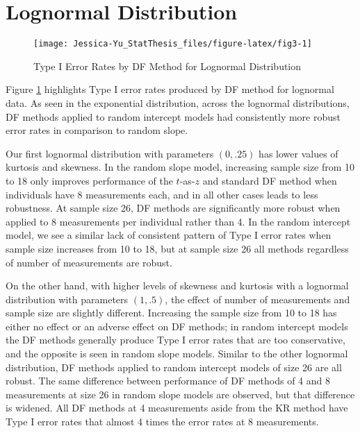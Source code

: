 \documentclass[12pt, twoside]{amherstthesis}
\begin{document}
\hypertarget{lognormal-distribution}{%
\section{Lognormal Distribution}\label{lognormal-distribution}}
\begin{figure}

{\centering \texttt{[image: Jessica-Yu\_StatThesis\_files/figure-latex/fig3-1]} 

}

\caption{Type I Error Rates by DF Method for Lognormal Distribution}\label{fig:fig3}
\end{figure}
Figure \ref{fig:fig3} highlights Type I error rates produced by DF method for lognormal data. As seen in the exponential distribution, across the lognormal distributions, DF methods applied to random intercept models had consistently more robust error rates in comparison to random slope.

Our first lognormal distribution with parameters \((0,.25)\) has lower values of kurtosis and skewness. In the random slope model, increasing sample size from 10 to 18 only improves performance of the \(t\)-as-\(z\) and standard DF method when individuals have 8 measurements each, and in all other cases leads to less robustness. At sample size 26, DF methods are significantly more robust when applied to 8 measurements per individual rather than 4. In the random intercept model, we see a similar lack of consistent pattern of Type I error rates when sample size increases from 10 to 18, but at sample size 26 all methods regardless of number of measurements are robust.

On the other hand, with higher levels of skewness and kurtosis with a lognormal distribution with parameters \((1,.5)\), the effect of number of measurements and sample size are slightly different. Increasing the sample size from 10 to 18 has either no effect or an adverse effect on DF methods; in random intercept models the DF methods generally produce Type I error rates that are too conservative, and the opposite is seen in random slope models. Similar to the other lognormal distribution, DF methods applied to random intercept models of size 26 are all robust. The same difference between performance of DF methods of 4 and 8 measurements at size 26 in random slope models are observed, but that difference is widened. All DF methods at 4 measurements aside from the KR method have Type I error rates that almost 4 times the error rates at 8 measurements.
\end{document}
